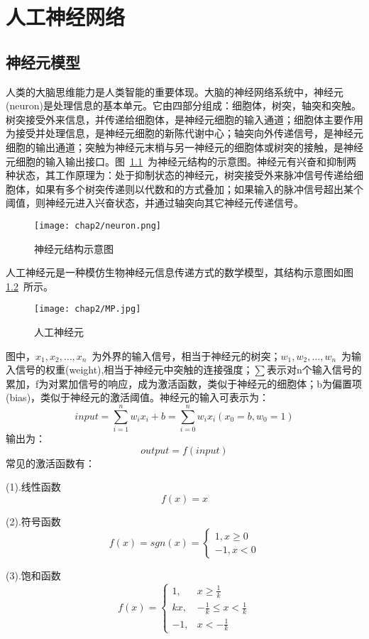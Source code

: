 \chapter{人工神经网络}
\section{神经元模型}
人类的大脑思维能力是人类智能的重要体现。大脑的神经网络系统中，神经元(neuron)是处理信息的基本单元。它由四部分组成：细胞体，树突，轴突和突触。树突接受外来信息，并传递给细胞体，是神经元细胞的输入通道；细胞体主要作用为接受并处理信息，是神经元细胞的新陈代谢中心；轴突向外传递信号，是神经元细胞的输出通道；突触为神经元末梢与另一神经元的细胞体或树突的接触，是神经元细胞的输入输出接口。图~\ref{fig:neuron}~为神经元结构的示意图。神经元有兴奋和抑制两种状态，其工作原理为：处于抑制状态的神经元，树突接受外来脉冲信号传递给细胞体，如果有多个树突传递则以代数和的方式叠加；如果输入的脉冲信号超出某个阈值，则神经元进入兴奋状态，并通过轴突向其它神经元传递信号。
\begin{figure}[!htb]
  \centering
  \texttt{[image: chap2/neuron.png]}
  \caption{神经元结构示意图}
  \label{fig:neuron}
\end{figure}

人工神经元是一种模仿生物神经元信息传递方式的数学模型，其结构示意图如图\ref{fig:MP}~所示。
\begin{figure}[!htb]
  \centering
  \texttt{[image: chap2/MP.jpg]}
  \caption{人工神经元}
  \label{fig:MP}
\end{figure}

图中，$x_{1}, x_{2}, …, x_{n}$~为外界的输入信号，相当于神经元的树突；$w_{1}, w_{2}, …, w_{n}$~为输入信号的权重(weight),相当于神经元中突触的连接强度；$\sum$表示对n个输入信号的累加，f为对累加信号的响应，成为激活函数，类似于神经元的细胞体；b为偏置项(bias)，类似于神经元的激活阈值。神经元的输入可表示为：
$$input = \sum_{i=1}^{n}w_{i}x_{i} +b = \sum_{i=0}^{n}w_{i}x_{i}  (x_{0} = b, w_{0} = 1)$$
输出为：
$$output = f(input)$$
常见的激活函数有：

(1).线性函数
$$f(x) = x$$

(2).符号函数
$$f(x) = sgn(x) = \left\{
\begin{aligned}
1, x \geq 0 \\
-1, x < 0
\end{aligned}
\right.
$$

(3).饱和函数
$$f(x) = \left\{
\begin{aligned}
1, &x \geq \frac{1}{k} \\
kx, &-\frac{1}{k} \leq x < \frac{1}{k}\\
-1, &x < -\frac{1}{k}
\end{aligned}
\right.
$$

